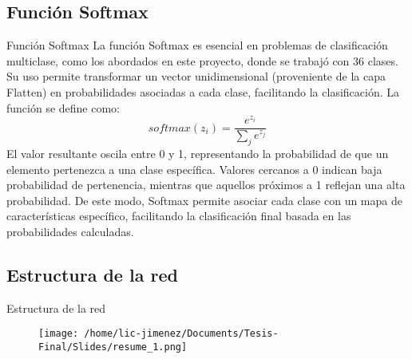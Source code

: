 \documentclass{beamer}
\begin{document}
\subsection{Función Softmax}
\begin{frame}{Función Softmax}  
    La función Softmax es esencial en problemas de clasificación multiclase, como los abordados en este proyecto, donde se trabajó con 36 clases. Su uso permite transformar un vector unidimensional (proveniente de la capa Flatten) en probabilidades asociadas a cada clase, facilitando la clasificación. La función se define como:
    \[
   softmax(z_i) = \frac{e^{z_i}}{\sum_j e^{z_j}}
    \]
    El valor resultante oscila entre 0 y 1, representando la probabilidad de que un elemento pertenezca a una clase específica. Valores cercanos a 0 indican baja probabilidad de pertenencia, mientras que aquellos próximos a 1 reflejan una alta probabilidad. De este modo, Softmax permite asociar cada clase con un mapa de características específico, facilitando la clasificación final basada en las probabilidades calculadas.
    
\end{frame}


\subsection{Estructura de la red}
\begin{frame}{Estructura de la red}
    \begin{figure}
        \centering
        \texttt{[image: /home/lic-jimenez/Documents/Tesis-Final/Slides/resume\_1.png]}
    \end{figure}
\end{frame}
\end{document}
